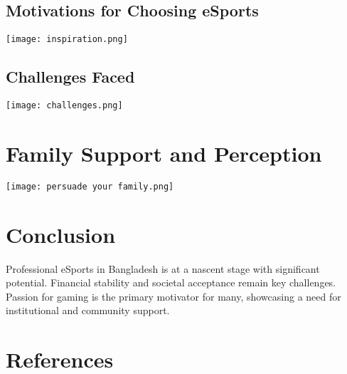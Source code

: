 \documentclass[a1paper,landscape]{a0poster}
\begin{document}
\begin{multicols}{3}
\subsection*{Motivations for Choosing eSports}
\texttt{[image: inspiration.png]}

\subsection*{Challenges Faced}
\texttt{[image: challenges.png]}

\section*{Family Support and Perception}
\texttt{[image: persuade your family.png]}

\section*{Conclusion}
Professional eSports in Bangladesh is at a nascent stage with significant potential. Financial stability and societal acceptance remain key challenges. Passion for gaming is the primary motivator for many, showcasing a need for institutional and community support.

\section*{References}



\end{multicols}
\end{document}
